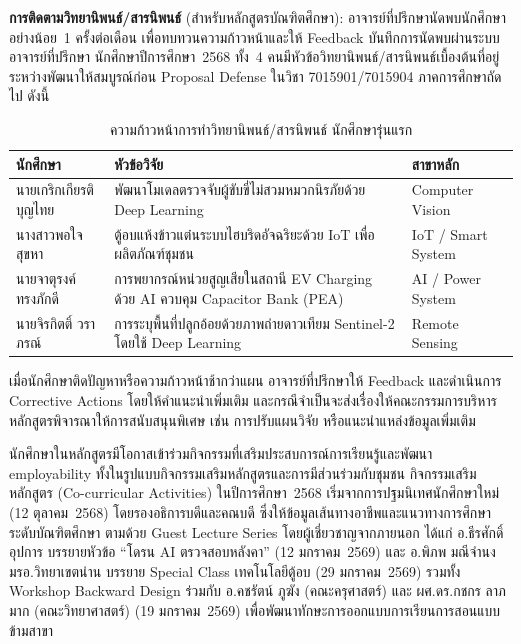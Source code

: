 \textbf{การติดตามวิทยานิพนธ์/สารนิพนธ์} (สำหรับหลักสูตรบัณฑิตศึกษา): อาจารย์ที่ปรึกษานัดพบนักศึกษาอย่างน้อย~1 ครั้งต่อเดือน เพื่อทบทวนความก้าวหน้าและให้ Feedback บันทึกการนัดพบผ่านระบบอาจารย์ที่ปรึกษา นักศึกษาปีการศึกษา~2568 ทั้ง~4 คนมีหัวข้อวิทยานิพนธ์/สารนิพนธ์เบื้องต้นที่อยู่ระหว่างพัฒนาให้สมบูรณ์ก่อน Proposal Defense ในวิชา 7015901/7015904 ภาคการศึกษาถัดไป ดังนี้

\begin{table}[H]
  \centering
  \caption{ความก้าวหน้าการทำวิทยานิพนธ์/สารนิพนธ์ นักศึกษารุ่นแรก}
  \label{tbl:thesis_progress}
  \begingroup
  \footnotesize
  \setlength{\tabcolsep}{3pt}
  \renewcommand{\arraystretch}{1.2}
  \begin{tabularx}{\linewidth}{|>{\raggedright\arraybackslash}p{3cm}|>{\raggedright\arraybackslash}X|l|}
    \hline
    \textbf{นักศึกษา} & \textbf{หัวข้อวิจัย} & \textbf{สาขาหลัก} \\
    \hline
    นายเกริกเกียรติ บุญไทย & พัฒนาโมเดลตรวจจับผู้ขับขี่ไม่สวมหมวกนิรภัยด้วย Deep Learning & Computer Vision \\
    \hline
    นางสาวพอใจ สุขหา & ตู้อบแห้งข้าวแต๋นระบบไฮบริดอัจฉริยะด้วย IoT เพื่อผลิตภัณฑ์ชุมชน & IoT / Smart System \\
    \hline
    นายจาตุรงค์ ทรงภักดี & การพยากรณ์หน่วยสูญเสียในสถานี EV Charging ด้วย AI ควบคุม Capacitor Bank (PEA) & AI / Power System \\
    \hline
    นายจิรกิตติ์ วราภรณ์ & การระบุพื้นที่ปลูกอ้อยด้วยภาพถ่ายดาวเทียม Sentinel-2 โดยใช้ Deep Learning & Remote Sensing \\
    \hline
  \end{tabularx}
  \endgroup
\end{table}

เมื่อนักศึกษาติดปัญหาหรือความก้าวหน้าช้ากว่าแผน อาจารย์ที่ปรึกษาให้ Feedback และดำเนินการ Corrective Actions โดยให้คำแนะนำเพิ่มเติม และกรณีจำเป็นจะส่งเรื่องให้คณะกรรมการบริหารหลักสูตรพิจารณาให้การสนับสนุนพิเศษ เช่น การปรับแผนวิจัย หรือแนะนำแหล่งข้อมูลเพิ่มเติม


นักศึกษาในหลักสูตรมีโอกาสเข้าร่วมกิจกรรมที่เสริมประสบการณ์การเรียนรู้และพัฒนา employability ทั้งในรูปแบบกิจกรรมเสริมหลักสูตรและการมีส่วนร่วมกับชุมชน กิจกรรมเสริมหลักสูตร (Co-curricular Activities) ในปีการศึกษา~2568 เริ่มจากการปฐมนิเทศนักศึกษาใหม่ (12 ตุลาคม~2568) โดยรองอธิการบดีและคณบดี ซึ่งให้ข้อมูลเส้นทางอาชีพและแนวทางการศึกษาระดับบัณฑิตศึกษา ตามด้วย Guest Lecture Series โดยผู้เชี่ยวชาญจากภายนอก ได้แก่ อ.ธีรศักดิ์ อุปการ บรรยายหัวข้อ ``โดรน AI ตรวจสอบหลังคา'' (12 มกราคม~2569) และ อ.พิภพ มณีจำนง มรอ.วิทยาเขตน่าน บรรยาย Special Class เทคโนโลยีตู้อบ (29 มกราคม~2569) รวมทั้ง Workshop Backward Design ร่วมกับ อ.คชรัตน์ ภูฆัง (คณะครุศาสตร์) และ ผศ.ดร.กชกร ลาภมาก (คณะวิทยาศาสตร์) (19 มกราคม~2569) เพื่อพัฒนาทักษะการออกแบบการเรียนการสอนแบบข้ามสาขา

